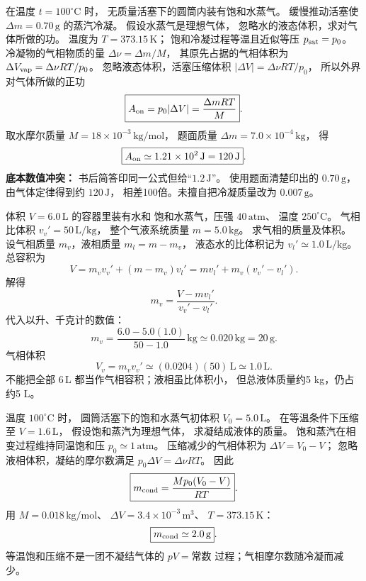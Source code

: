在温度 $t=100^\circ\mathrm C$ 时，
无质量活塞下的圆筒内装有饱和水蒸气。
缓慢推动活塞使
$\Delta m=0.70\,\mathrm g$ 的蒸汽冷凝。
假设水蒸气是理想气体，
忽略水的液态体积，求对气体所做的功。
\exsolution
温度为 $T=373.15\,\mathrm K$；
饱和冷凝过程等温且近似等压
$p_{\rm sat}=p_0$。
冷凝物的气相物质的量
$\Delta\nu=\Delta m/M$，
其原先占据的气相体积为
$\Delta V_{\rm vap}=\Delta\nu RT/p_0$。
忽略液态体积，活塞压缩体积
$|\Delta V|=\Delta\nu RT/p_0$，
所以外界对气体所做的正功
\[
\boxed{A_{\rm on}=p_0|\Delta V|
=\frac{\Delta m RT}{M}}.
\]
取水摩尔质量
$M=18\times10^{-3}\,\mathrm{kg/mol}$，
题面质量 $\Delta m=7.0\times10^{-4}\,\mathrm{kg}$，
得
\[
\boxed{A_{\rm on}\simeq1.21\times10^2\,\mathrm J=120\,\mathrm J}.
\]
\excheck \textbf{底本数值冲突：}
书后简答印同一公式但给“$1.2\,\mathrm J$”。
使用题面清楚印出的 $0.70\,\mathrm g$，
由气体定律得到约 $120\,\mathrm J$，
相差100倍。未擅自把冷凝质量改为 $0.007\,\mathrm g$。

体积 $V=6.0\,\mathrm L$ 的容器里装有水和
饱和水蒸气，压强 $40\,\mathrm{atm}$、
温度 $250^\circ\mathrm C$。
气相比体积
$v_v'=50\,\mathrm{L/kg}$，
整个气液系统质量
$m=5.0\,\mathrm{kg}$。
求气相的质量及体积。
\exsolution
设气相质量 $m_v$，液相质量
$m_l=m-m_v$，
液态水的比体积记为
$v_l'\simeq1.0\,\mathrm{L/kg}$。
总容积为
\[
V=m_vv_v'+(m-m_v)v_l'
=m v_l'+m_v(v_v'-v_l').
\]
解得
\[
\boxed{m_v=\frac{V-mv_l'}{v_v'-v_l'}}.
\]
代入以升、千克计的数值：
\[
m_v=\frac{6.0-5.0(1.0)}{50-1.0}
\,\mathrm{kg}
\simeq\boxed{0.020\,\mathrm{kg}=20\,\mathrm g}.
\]
气相体积
\[
\boxed{V_v=m_vv_v'\simeq(0.0204)(50)
\,\mathrm L\simeq1.0\,\mathrm L}.
\]
\excheck 不能把全部 $6\,\mathrm L$
都当作气相容积；液相虽比体积小，
但总液体质量约5 kg，仍占约5 L。

温度 $100^\circ\mathrm C$ 时，
圆筒活塞下的饱和水蒸气初体积
$V_0=5.0\,\mathrm L$。
在等温条件下压缩至
$V=1.6\,\mathrm L$，
假设饱和蒸汽为理想气体，
求凝结成液体的质量。
\exsolution
饱和蒸汽在相变过程维持同温饱和压
$p_0\simeq1\,\mathrm{atm}$。
压缩减少的气相体积为
$\Delta V=V_0-V$；
忽略液相体积，凝结的摩尔数满足
$p_0\Delta V=\Delta\nu RT$。
因此
\[
\boxed{m_{\rm cond}=
\frac{Mp_0(V_0-V)}{RT}}.
\]
用 $M=0.018\,\mathrm{kg/mol}$、
$\Delta V=3.4\times10^{-3}\,\mathrm{m^3}$、
$T=373.15\,\mathrm K$：
\[
\boxed{m_{\rm cond}\simeq2.0\,\mathrm g}.
\]
\excheck 等温饱和压缩不是一团不凝结气体的
$pV=\text{常数}$ 过程；气相摩尔数随冷凝而减少。

